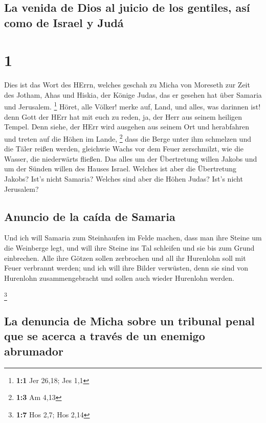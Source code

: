 \hypertarget{la-venida-de-dios-al-juicio-de-los-gentiles-asuxed-como-de-israel-y-juduxe1}{%
\subsection{La venida de Dios al juicio de los gentiles, así como de
Israel y
Judá}\label{la-venida-de-dios-al-juicio-de-los-gentiles-asuxed-como-de-israel-y-juduxe1}}

\hypertarget{section}{%
\section{1}\label{section}}

 Dies ist das Wort des HErrn, welches geschah zu Micha von
Moreseth zur Zeit des Jotham, Ahas und Hiskia, der Könige Judas, das er
gesehen hat über Samaria und Jerusalem. \footnote{\textbf{1:1} Jer
  26,18; Jes 1,1}  Höret, alle Völker! merke auf, Land,
und alles, was darinnen ist! denn Gott der HErr hat mit euch zu reden,
ja, der Herr aus seinem heiligen Tempel.  Denn siehe, der
HErr wird ausgehen aus seinem Ort und herabfahren und treten auf die
Höhen im Lande, \footnote{\textbf{1:3} Am 4,13}  dass die
Berge unter ihm schmelzen und die Täler reißen werden, gleichwie Wachs
vor dem Feuer zerschmilzt, wie die Wasser, die niederwärts fließen.
 Das alles um der Übertretung willen Jakobs und um der
Sünden willen des Hauses Israel. Welches ist aber die Übertretung
Jakobs? Ist's nicht Samaria? Welches sind aber die Höhen Judas? Ist's
nicht Jerusalem?

\hypertarget{anuncio-de-la-cauxedda-de-samaria}{%
\subsection{Anuncio de la caída de
Samaria}\label{anuncio-de-la-cauxedda-de-samaria}}

 Und ich will Samaria zum Steinhaufen im Felde machen,
dass man ihre Steine um die Weinberge legt, und will ihre Steine ins Tal
schleifen und sie bis zum Grund einbrechen.  Alle ihre
Götzen sollen zerbrochen und all ihr Hurenlohn soll mit Feuer verbrannt
werden; und ich will ihre Bilder verwüsten, denn sie sind von Hurenlohn
zusammengebracht und sollen auch wieder Hurenlohn werden.

\footnote{\textbf{1:7} Hos 2,7; Hos 2,14}

\hypertarget{la-denuncia-de-micha-sobre-un-tribunal-penal-que-se-acerca-a-travuxe9s-de-un-enemigo-abrumador}{%
\subsection{La denuncia de Micha sobre un tribunal penal que se acerca a
través de un enemigo
abrumador}\label{la-denuncia-de-micha-sobre-un-tribunal-penal-que-se-acerca-a-travuxe9s-de-un-enemigo-abrumador}}

